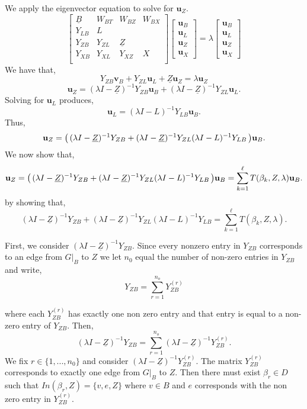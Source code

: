 \documentclass{paper}
\begin{document}
We apply the eigenvector equation to solve for $\mathbf{u}_{Z}$.
\[
\begin{bmatrix}
\underline{B} & W_{BT} & W_{BZ} & W_{BX} \\
Y_{LB} & L \\
Y_{ZB} & Y_{ZL} & \underline{Z} \\
Y_{XB} & Y_{XL} & Y_{XZ} & X \\
\end{bmatrix}
\begin{bmatrix}
\mathbf{u}_B \\
\mathbf{u}_{L} \\
\mathbf{u}_{Z} \\
\mathbf{u}_{X}
\end{bmatrix}
= 
\lambda
\begin{bmatrix}
\mathbf{u}_B \\
\mathbf{u}_{L} \\
\mathbf{u}_{Z} \\
\mathbf{u}_{X}
\end{bmatrix}
\]
We have that,
\[
Y_{ZB}\mathbf{v}_B + Y_{ZL}\mathbf{u}_L + \underline{Z} \mathbf{u}_Z = \lambda \mathbf{u}_Z
\]
\[
\mathbf{u}_{Z} = (\lambda I - \underline{Z})^{-1}Y_{ZB} \mathbf{u}_{B} + (\lambda	I - \underline{Z})^{-1}Y_{ZL} \mathbf{u}_{L}.
\]
Solving for $\mathbf{u}_L$ produces,
\[
\mathbf{u}_{L} = (\lambda I - L)^{-1}Y_{LB} \mathbf{u}_{B}.
\]
Thus,
\[
\mathbf{u}_{Z} = \big{(}\,(\lambda I - \underline{Z})^{-1}Y_{ZB} + (\lambda	I - \underline{Z})^{-1}Y_{ZL} (\lambda I - L)^{-1}Y_{LB} \,\big{)}\mathbf{u}_B.
\]
We now show that,
\[
\mathbf{u}_{Z} = \big{(}\,(\lambda I - \underline{Z})^{-1}Y_{ZB} + (\lambda	I - \underline{Z})^{-1}Y_{ZL} (\lambda I - L)^{-1}Y_{LB} \,\big{)}\mathbf{u}_B = \sum_{k=1}^{\ell} T(\beta_k,Z,\lambda) \mathbf{u}_B.
\]
by showing that,
\begin{equation}
(\lambda I - \underline{Z})^{-1}Y_{ZB} + (\lambda	I - \underline{Z})^{-1}Y_{ZL} (\lambda I - L)^{-1}Y_{LB} = \sum_{k=1}^{\ell} T(\beta_k,Z,\lambda).
\end{equation}

First, we consider $(\lambda I - \underline{Z})^{-1}Y_{ZB}$. Since every nonzero entry in $Y_{ZB}$ corresponds to an edge from $G|_B$ to $Z$ we let $n_0$ equal the number of non-zero entries in $Y_{ZB}$ and write,
\[
Y_{ZB} = \sum_{r=1}^{n_o}Y_{ZB}^{(r)}
\]

where each $Y_{ZB}^{(r)}$ has exactly one non zero entry and that entry is equal to a non-zero entry of $Y_{ZB}$. Then, 
\[
(\lambda I - \underline{Z})^{-1}Y_{ZB} = \sum_{r=1}^{n_o}(\lambda I - \underline{Z})^{-1} Y_{ZB}^{(r)}.
\]
We fix $r \in \{1,...,n_0\}$ and consider $(\lambda I - \underline{Z})^{-1} Y_{ZB}^{(r)}$. The matrix $Y_{ZB}^{(r)}$ corresponds to exactly one edge from $G|_B$ to $Z$. Then there must exist $\beta_r \in D$ such that $In(\beta_r,Z) = \{v,e,Z\}$ where $v \in B$ and $e$ corresponds with the non zero entry in $Y_{ZB}^{(r)}$. 
\end{document}
